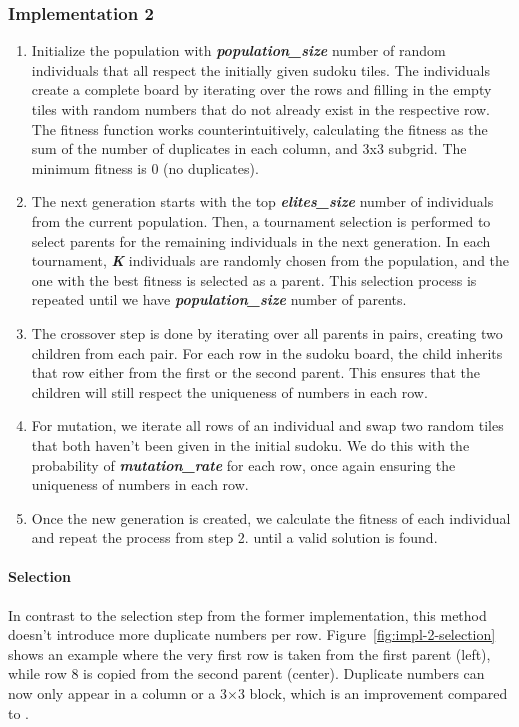 \pagebreak
\subsubsection{Implementation 2}
\begin{enumerate}
\item Initialize the population with \textit{\textbf{population\_size}} number of random individuals that all respect the initially given sudoku tiles. The individuals create a complete board by iterating over the rows and filling in the empty tiles with random numbers that do not already exist in the respective row. The fitness function works counterintuitively, calculating the fitness as the sum of the number of duplicates in each column, and 3x3 subgrid. The minimum fitness is 0 (no duplicates).
\item The next generation starts with the top \textit{\textbf{elites\_size}} number of individuals from the current population. Then, a tournament selection is performed to select parents for the remaining individuals in the next generation. In each tournament, \textit{\textbf{K}} individuals are randomly chosen from the population, and the one with the best fitness is selected as a parent. This selection process is repeated until we have \textit{\textbf{population\_size}} number of parents.
\item The crossover step is done by iterating over all parents in pairs, creating two children from each pair. For each row in the sudoku board, the child inherits that row either from the first or the second parent. This ensures that the children will still respect the uniqueness of numbers in each row.
\item For mutation, we iterate all rows of an individual and swap two random tiles that both haven't been given in the initial sudoku. We do this with the probability of \textit{\textbf{mutation\_rate}} for each row, once again ensuring the uniqueness of numbers in each row.
\item Once the new generation is created, we calculate the fitness of each individual and repeat the process from step 2. until a valid solution is found.
\end{enumerate}

\paragraph{Selection} In contrast to the selection step from the former implementation, this method doesn't introduce more duplicate numbers per row. Figure~\ref{fig:impl-2-selection} shows an example where the very first row is taken from the first parent (left), while row 8 is copied from the second parent (center). Duplicate numbers can now only appear in a column or a 3$\times$3 block, which is an improvement compared to .


